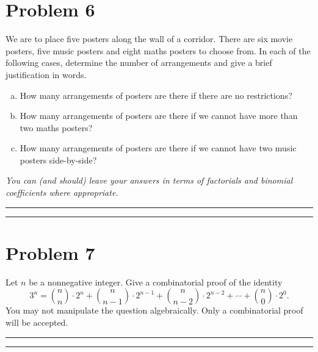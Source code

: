 \documentclass{article}
\theoremstyle{definition}
\newenvironment{solution}{\bigskip\hrule{\hfill}}{\bigskip\hrule{\hfill}} %
\begin{document}
\section*{Problem 6}
We are to place five posters along the wall of a corridor. There are six movie posters, five music posters and eight maths posters to choose from. In each of the following cases, determine the number of arrangements and give a brief justification in words.
\begin{enumerate}[a)] %
    \item How many arrangements of posters are there if there are no restrictions?
    \item How many arrangements of posters are there if we cannot have more than two maths posters?
    \item How many arrangements of posters are there if we cannot have two music posters side-by-side?
\end{enumerate}
\emph{You can (and should) leave your answers in terms of factorials and binomial coefficients where appropriate.}
\begin{solution}


\end{solution}


\newpage


\section*{Problem 7}
Let $n$ be a nonnegative integer. Give a combinatorial proof of the identity $$3^n=\binom{n}{n}\cdot2^n+\binom{n}{n-1}\cdot2^{n-1}+\binom{n}{n-2}\cdot2^{n-2}+\cdots+\binom{n}{0}\cdot2^0.$$ You may not manipulate the question algebraically. Only a combinatorial proof will be accepted.
\begin{solution}


\end{solution}
\end{document}
